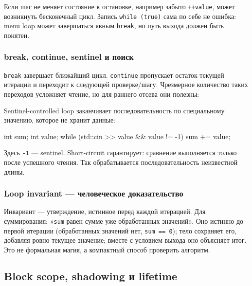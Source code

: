 Если шаг не меняет состояние к остановке, например забыто \texttt{++value},
может возникнуть бесконечный цикл. Запись \texttt{while (true)} сама по себе
не ошибка: menu loop может завершаться явным \texttt{break}, но путь выхода
должен быть понятен.

\subsubsection{break, continue, sentinel и поиск}

\texttt{break} завершает ближайший цикл. \texttt{continue} пропускает остаток
текущей итерации и переходит к следующей проверке/шагу. Чрезмерное количество
таких переходов усложняет чтение, но для раннего отсева они полезны:


Sentinel-controlled loop заканчивает последовательность по специальному
значению, которое не хранит данные:

\begin{cppcode}
int sum{};
int value{};
while (std::cin >> value && value != -1) {
    sum += value;
}
\end{cppcode}

Здесь \texttt{-1} --- sentinel. Short-circuit гарантирует: сравнение
выполняется только после успешного чтения. Так обрабатывается последовательность
неизвестной длины.

\subsubsection{Loop invariant --- человеческое доказательство}

Инвариант --- утверждение, истинное перед каждой итерацией. Для суммирования:
«\texttt{sum} равен сумме уже обработанных значений». Оно истинно до первой
итерации (обработанных значений нет, \texttt{sum == 0}); тело сохраняет его,
добавляя ровно текущее значение; вместе с условием выхода оно объясняет итог.
Это не формальная магия, а компактный способ проверить алгоритм.

\subsection{Block scope, shadowing и lifetime}

